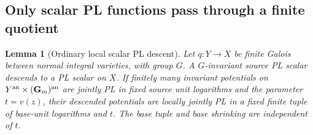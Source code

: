 \documentclass[11pt,a4paper]{article}
\newtheorem{lemma}[theorem]{Lemma}
\theoremstyle{definition}
\theoremstyle{remark}
\begin{document}
\subsection{Only scalar PL functions pass through a finite quotient}

\begin{lemma}[Ordinary local scalar PL descent]
\label{r11p:pl-descent}
Let $q:Y\to X$ be finite Galois between normal integral varieties, with
group $G$.  A $G$-invariant source PL scalar descends to a PL scalar on
$X$.  If finitely many invariant potentials on
$Y^{\rm an}\times(\mathbf G_m)^{\rm an}$ are jointly PL in fixed source
unit logarithms and the parameter $t=v(z)$, their descended potentials
are locally jointly PL in a fixed finite tuple of base-unit logarithms
and $t$.  The base tuple and base shrinking are independent of $t$.
\end{lemma}
\end{document}

